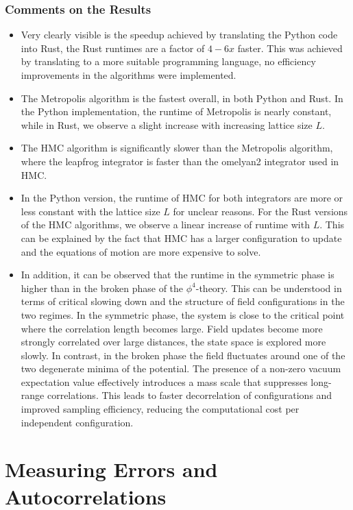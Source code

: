 \subsubsection*{Comments on the Results}
\begin{itemize}
    \item Very clearly visible is the speedup achieved by translating the Python code into Rust, the Rust runtimes are a factor of $4-6x$ faster. This was achieved by translating to a more suitable programming language, no efficiency improvements in the algorithms were implemented.
    \item The Metropolis algorithm is the fastest overall, in both Python and Rust. In the Python implementation, the runtime of Metropolis is nearly constant, while in Rust, we observe a slight increase with increasing lattice size $L$. 
    \item The HMC algorithm is significantly slower than the Metropolis algorithm, where the leapfrog integrator is faster than the omelyan2 integrator used in HMC. 
    \item In the Python version, the runtime of HMC for both integrators are more or less constant with the lattice size $L$ for unclear reasons. For the Rust versions of the HMC algorithms, we observe a linear increase of runtime with $L$. This can be explained by the fact that HMC has a larger configuration to update and the equations of motion are more expensive to solve. 
    \item In addition, it can be observed that the runtime in the symmetric phase is higher than in the broken phase of the $\phi^4$-theory. This can be understood in terms of critical slowing down and the structure of field configurations in the two regimes. In the symmetric phase, the system is close to the critical point where the correlation length becomes large. Field updates become more strongly correlated over large distances, the state space is explored more slowly. In contrast, in the broken phase the field fluctuates around one of the two degenerate minima of the potential. The presence of a non-zero vacuum expectation value effectively introduces a mass scale that suppresses long-range correlations. This leads to faster decorrelation of configurations and improved sampling efficiency, reducing the computational cost per independent configuration. \cite{GattingerLang}
\end{itemize}
\section{Measuring Errors and Autocorrelations}\label{sec: errs}
